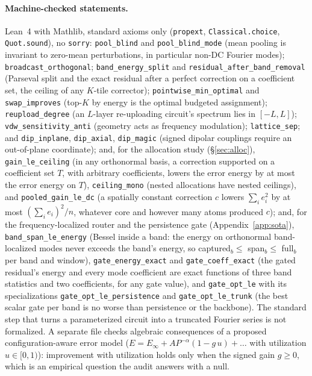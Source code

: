 \documentclass{article}
\begin{document}
\paragraph{Machine-checked statements.} {\sloppy Lean~4 with Mathlib, standard axioms only (\texttt{propext},
\texttt{Classical.choice}, \texttt{Quot.sound}), no \texttt{sorry}: \texttt{pool\_blind} and \texttt{pool\_blind\_mode}
(mean pooling is invariant to zero-mean perturbations, in particular non-DC Fourier modes); \texttt{broadcast\_orthogonal};
\texttt{band\_energy\_split} and \texttt{residual\_after\_band\_removal} (Parseval split and the exact residual after a
perfect correction on a coefficient set, the ceiling of any $K$-tile corrector); \texttt{pointwise\_min\_optimal} and
\texttt{swap\_improves} (top-$K$ by energy is the optimal budgeted assignment); \texttt{reupload\_degree} (an $L$-layer
re-uploading circuit's spectrum lies in $[-L, L]$); \texttt{vdw\_sensitivity\_anti} (geometry acts as frequency
modulation); \texttt{lattice\_sep}; and \texttt{dip\_inplane}, \texttt{dip\_axial}, \texttt{dip\_magic} (signed dipolar
couplings require an out-of-plane coordinate); and, for the allocation study (\S\ref{sec:alloc}),
\texttt{gain\_le\_ceiling} (in any orthonormal basis, a correction supported on a coefficient set $T$, with arbitrary
coefficients, lowers the error energy by at most the error energy on $T$), \texttt{ceiling\_mono} (nested allocations
have nested ceilings), and \texttt{pooled\_gain\_le\_dc} (a spatially constant correction $c$ lowers
$\sum_i e_i^2$ by at most $(\sum_i e_i)^2/n$, whatever core and however many atoms produced $c$); and, for the
frequency-localized router and the persistence gate (Appendix~\ref{app:sota}), \texttt{band\_span\_le\_energy} (Bessel
inside a band: the energy on orthonormal band-localized modes never exceeds the band's energy, so captured$_b\le$
span$_b\le$ full$_b$ per band and window), \texttt{gate\_energy\_exact} and \texttt{gate\_coeff\_exact} (the gated
residual's energy and every mode coefficient are exact functions of three band statistics and two coefficients, for any
gate value), and \texttt{gate\_opt\_le} with its specializations \texttt{gate\_opt\_le\_persistence} and
\texttt{gate\_opt\_le\_trunk} (the best scalar gate per band is no worse than persistence or the backbone). The standard step that turns a parameterized circuit into a truncated
Fourier series is not formalized. A separate file checks algebraic consequences of a proposed configuration-aware
error model ($E = E_\infty + A P^{-\alpha}(1 - g\,u) + \dots$ with utilization $u \in [0,1)$): improvement with
utilization holds only when the signed gain $g \ge 0$, which is an empirical question the audit answers with a null.\par}
\end{document}
